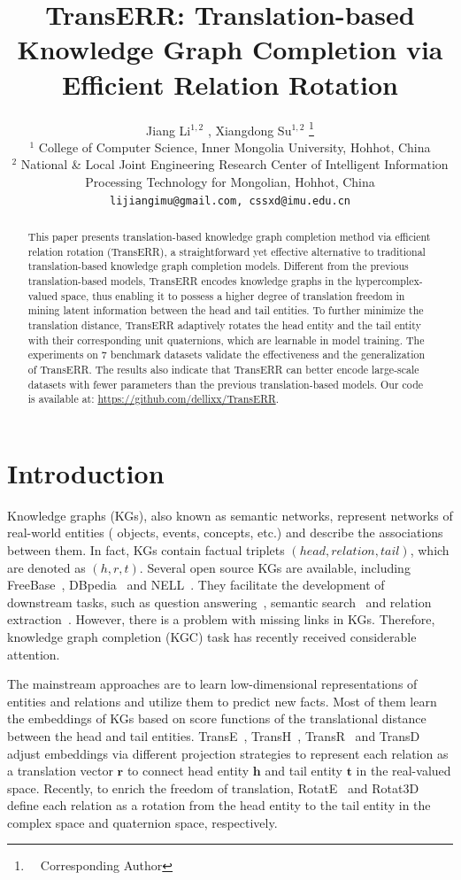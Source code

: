 \documentclass[11pt]{article}
\title{TransERR: Translation-based Knowledge Graph Completion via Efficient Relation Rotation}
\author{Jiang Li$^{1,2}$ ,  Xiangdong Su$^{1,2}$ \thanks{\ \ Corresponding Author} \\
$^1$ College of Computer Science, Inner Mongolia University, Hohhot, China \\ $^2$ National \& Local Joint Engineering Research Center of Intelligent Information \\ Processing Technology for Mongolian, Hohhot, China \\ \texttt{lijiangimu@gmail.com, cssxd@imu.edu.cn}}
\begin{document}
\maketitle
\begin{abstract}
	This paper presents translation-based knowledge graph completion method via efficient relation rotation (TransERR), a straightforward yet effective alternative to traditional translation-based knowledge graph completion models. Different from the previous translation-based models, TransERR encodes knowledge graphs in the hypercomplex-valued space, thus enabling it to possess a higher degree of translation freedom in mining latent information between the head and tail entities. To further minimize the translation distance, TransERR adaptively rotates the head entity and the tail entity with their corresponding unit quaternions, which are learnable in model training.  The experiments on 7 benchmark datasets validate the effectiveness and the generalization of TransERR. The results also indicate that TransERR can better encode large-scale datasets with fewer parameters than the previous translation-based models. Our code is available at: \url{https://github.com/dellixx/TransERR}.

\end{abstract}

\section{Introduction}
Knowledge graphs (KGs), also known as semantic networks, represent networks of real-world entities ( objects, events, concepts, etc.) and describe the associations between them. In fact, KGs contain factual triplets $(head, relation, tail)$, which are denoted as $(h, r, t)$. Several open source KGs are available, including FreeBase~\cite{4bollacker2008freebase}, DBpedia~\cite{45lehmann2015dbpedia} and  NELL~\cite{46mitchell2018never}. They facilitate the development of downstream tasks, such as question answering~\cite{2}, semantic search~\cite{3junior2020knowledge} and relation extraction~\cite{1}. However, there is a problem with missing links in KGs. Therefore,  knowledge graph completion (KGC) task has recently received considerable attention.

The mainstream approaches are to learn low-dimensional representations of entities and relations and utilize them to predict new facts. Most of them learn the embeddings of KGs based on score functions of the translational distance between the head and tail entities. TransE~\cite{7bordes2013translating}, TransH~\cite{81wang2014knowledge}, TransR~\cite{9lin2015learning} and TransD~\cite{10ji2015knowledge} adjust embeddings via different projection strategies to represent each relation as a translation vector $\mathbf{r}$ to connect head entity $\mathbf{h}$ and tail entity $\mathbf{t}$ in the real-valued space. 
Recently, to enrich the freedom of translation, RotatE~\cite{31sun2019rotate} and Rotat3D~\cite{15gao2020rotate3d} define each relation as a rotation from  the head entity to the tail entity in the complex space and quaternion space, respectively.
\end{document}

